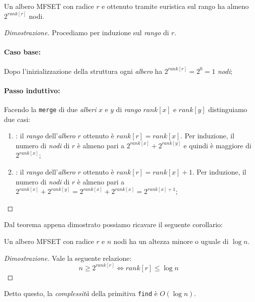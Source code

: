 \begin{definition}
    Un albero MFSET con radice $r$ e ottenuto tramite euristica sul rango ha
    almeno $2^{rank[r]}$ nodi.
\end{definition}
\begin{proof}[Dimostrazione]
    Procediamo per induzione sul \emph{rango} di $r$.

    \paragraph{Caso base: }
    Dopo l'inizializzazione della struttura ogni \emph{albero} ha $2^{rank[r]}
    =2^0=1$ \emph{nodi};

    \paragraph{Passo induttivo: }
    Facendo la \texttt{merge} di due \emph{alberi} $x$ e $y$ di \emph{rango}
    $rank[x]$ e $rank[y]$ distinguiamo due casi:
    \begin{enumerate}
        \item {}: il \emph{rango} dell'\emph{albero} $r$
        ottenuto è $rank[r]=rank[x]$. Per induzione, il numero di \emph{nodi} di
        $r$ è almeno pari a $2^{rank[x]}+2^{rank[y]}$ e quindi è maggiore di
        $2^{rank[x]}$;
        \item {}: il \emph{rango} dell'\emph{albero} $r$
        ottenuto è $rank[r]=rank[x]+1$. Per induzione, il numero di \emph{nodi}
        di $r$ è almeno pari a $2^{rank[x]}+2^{rank[y]}=2^{rank[x]}+2^{rank[x]}=
        2^{rank[x]+1}$;
    \end{enumerate}
\end{proof}

\noindent
Dal teorema appena dimostrato possiamo ricavare il seguente corollario:
\begin{definition}[Corollario]
    Un albero MFSET con radice $r$ e $n$ nodi ha un altezza minore o uguale di
    $\log n$.
\end{definition}
\begin{proof}[Dimostrazione]
    Vale la seguente relazione:
    \[n\geq 2^{rank[r]}\Leftrightarrow rank[r]\leq\log n\]
\end{proof}

\noindent
Detto questo, la \emph{complessità} della primitiva \texttt{find} è $O(\log n)$.

